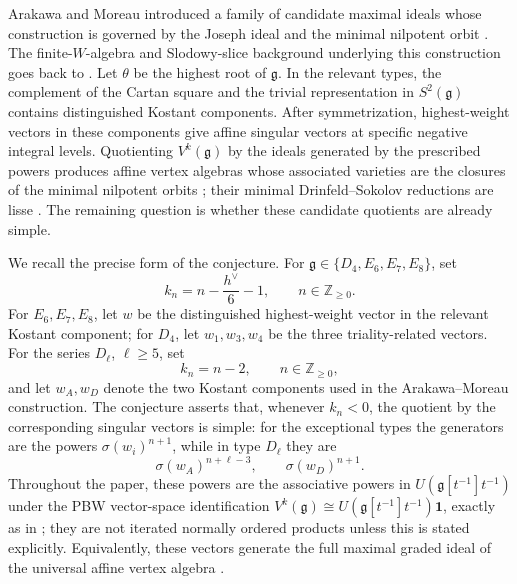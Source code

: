 \documentclass[11pt,reqno]{amsart}
\theoremstyle{definition}
\theoremstyle{remark}
\begin{document}
Arakawa and Moreau introduced a family of candidate maximal ideals whose
construction is governed by the Joseph ideal and the minimal nilpotent
orbit \cite{ArakawaMoreau2018}.  The finite-$W$-algebra and Slodowy-slice
background underlying this construction goes back to
\cite{Premet2002,GanGinzburg2002}.  Let $\theta$ be the highest root of
$\mathfrak g$.  In the relevant types, the complement of the Cartan square
and the trivial representation in $S^2(\mathfrak g)$ contains distinguished
Kostant components.  After symmetrization, highest-weight vectors in these
components give affine singular vectors at specific negative integral
levels.  Quotienting $V^k(\mathfrak g)$ by the ideals generated by the
prescribed powers produces affine vertex algebras whose associated
varieties are the closures of the minimal nilpotent orbits
\cite[Proposition~5.2]{ArakawaMoreau2018}; their minimal
Drinfeld--Sokolov reductions are lisse
\cite[Theorem~6.1(3)]{ArakawaMoreau2018}.  The remaining question is
whether these candidate quotients are already simple.

We recall the precise form of the conjecture.  For
$\mathfrak g\in\{D_4,E_6,E_7,E_8\}$, set
\begin{equation}\label{eq:intro-exceptional-levels}
  k_n=n-\frac{h^\vee}{6}-1,
  \qquad n\in\mathbb Z_{\ge0}.
\end{equation}
For $E_6,E_7,E_8$, let $w$ be the distinguished highest-weight vector in
the relevant Kostant component; for $D_4$, let $w_1,w_3,w_4$ be the three
triality-related vectors.  For the series $D_\ell$, $\ell\ge5$, set
\begin{equation*}
  k_n=n-2,
  \qquad n\in\mathbb Z_{\ge0},
\end{equation*}
and let $w_A,w_D$ denote the two Kostant components used in the
Arakawa--Moreau construction.  The conjecture asserts that, whenever
$k_n<0$, the quotient by the corresponding singular vectors is simple:
for the exceptional types the generators are the powers
$\sigma(w_i)^{n+1}$, while in type $D_\ell$ they are
\begin{equation*}
  \sigma(w_A)^{n+\ell-3},
  \qquad
  \sigma(w_D)^{n+1}.
\end{equation*}
Throughout the paper, these powers are the associative powers in
$U(\mathfrak g[t^{-1}]t^{-1})$ under the PBW vector-space identification
$V^k(\mathfrak g)\cong U(\mathfrak g[t^{-1}]t^{-1})\mathbf1$, exactly as
in \cite[Section~4]{ArakawaMoreau2018}; they are not iterated normally
ordered products unless this is stated explicitly.
Equivalently, these vectors generate the full maximal graded ideal of the
universal affine vertex algebra
\cite[Conjecture~1]{ArakawaMoreau2018}.
\end{document}
